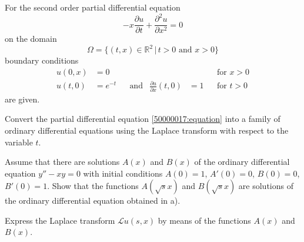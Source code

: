 For the second order partial differential equation
\begin{equation}
-x\frac{\partial u}{\partial t}
+
\frac{\partial^2 u}{\partial x^2}
=
0
\label{50000017:equation}
\end{equation}
on the domain
\[
\Omega = \{ (t,x)\in \mathbb R^2 \,|\, \text{$t>0$ and $x>0$}\}
\]
boundary conditions
\[
\begin{aligned}
u(0,x) &= 0
&&&&
&&\text{for $x>0$}
\\
u(t,0) &= e^{-t}
&&\text{and}&
\frac{\partial u}{\partial x}(t,0) &= 1
&&\text{for $t>0$}
\end{aligned}
\]
are given.
\begin{teilaufgaben}
\item
Convert the partial differential equation \eqref{50000017:equation}
into a family of ordinary differential equations using the
Laplace transform with respect to the variable $t$.
\item
Assume that there are solutions $A(x)$ and $B(x)$ of the
ordinary differential equation $y''-xy=0$ with
initial conditions $A(0)=1$, $A'(0)=0$,
$B(0)=0$, $B'(0)=1$.
Show that the functions $A(\sqrt{s}x)$ and $B(\sqrt{s}x)$
are solutions of the ordinary differential equation obtained in a).
\item
Express the Laplace transform $\mathscr{L}u(s,x)$ by means of the functions
$A(x)$ and $B(x)$.
\end{teilaufgaben}


